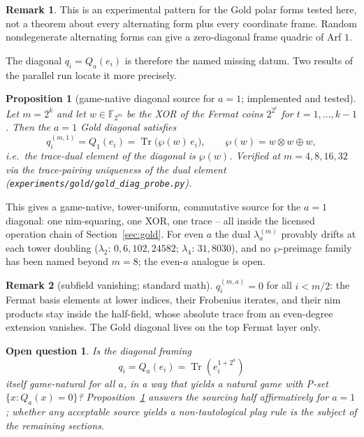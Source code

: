 \documentclass[11pt]{article}
\theoremstyle{plain}
\newtheorem{proposition}{Proposition}
\newtheorem*{question}{Open question}
\theoremstyle{definition}
\newtheorem{remark}{Remark}
\newcommand{\F}{\mathbb{F}}
\newcommand{\Tr}{\operatorname{Tr}}
\newcommand{\nimmul}{\otimes}
\begin{document}
\begin{remark}
This is an experimental pattern for the Gold polar forms tested here, not a
theorem about every alternating form plus every coordinate frame. Random
nondegenerate alternating forms can give a zero-diagonal frame quadric of Arf
$1$.
\end{remark}

The diagonal $q_i=Q_a(e_i)$ is therefore the named missing datum. Two results
of the parallel run locate it more precisely.

\begin{proposition}[game-native diagonal source for $a=1$; implemented and
tested]\label{prop:wp}
Let $m=2^k$ and let $w\in\F_{2^m}$ be the XOR of the Fermat coins
$2^{2^t}$ for $t=1,\dots,k-1$. Then the $a=1$ Gold diagonal satisfies
\[
  q_i^{(m,1)}=Q_1(e_i)=\Tr\!\bigl(\wp(w)\,e_i\bigr),
  \qquad
  \wp(w)=w\nimmul w\oplus w,
\]
i.e.\ the trace-dual element of the diagonal is $\wp(w)$. Verified at
$m=4,8,16,32$ via the trace-pairing uniqueness of the dual element
(\texttt{experiments/gold/gold\_diag\_probe.py}).
\end{proposition}

This gives a game-native, tower-uniform, commutative source for the $a=1$
diagonal: one nim-squaring, one XOR, one trace -- all inside the licensed
operation chain of Section~\ref{sec:gold}. For even $a$ the dual
$\lambda_a^{(m)}$ provably drifts at each tower doubling
($\lambda_2$: $0,6,102,24582$; $\lambda_4$: $31,8030$), and no
$\wp$-preimage family has been named beyond $m=8$; the even-$a$ analogue is
open.

\begin{remark}[subfield vanishing; standard math]
$q_i^{(m,a)}=0$ for all $i<m/2$: the Fermat basis elements at lower indices,
their Frobenius iterates, and their nim products stay inside the half-field,
whose absolute trace from an even-degree extension vanishes. The Gold diagonal
lives on the top Fermat layer only.
\end{remark}

\begin{question}
Is the diagonal framing
\[
  q_i=Q_a(e_i)=\Tr(e_i^{1+2^a})
\]
itself game-natural for all $a$, in a way that yields a natural game with
P-set $\{x:Q_a(x)=0\}$? Proposition~\ref{prop:wp} answers the
\emph{sourcing} half affirmatively for $a=1$; whether any acceptable source
yields a non-tautological \emph{play rule} is the subject of the remaining
sections.
\end{question}
\end{document}
